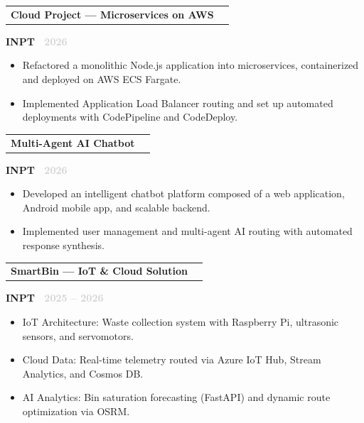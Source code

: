 \documentclass[10.5pt,a4paper]{article}
\makeatletter
\newcommand{\entryheader}[2]{%
  \noindent
  \begin{tabularx}{\linewidth}{@{}X r@{}}
    \textbf{\normalsize #1} & {\small\textcolor{lightgray}{#2}}
  \end{tabularx}\vspace{-1pt}
}
\newcommand{\cvsubline}[1]{%
  {\normalsize\textbf{\textcolor{accent}{#1}}}\par\vspace{2pt}
}
\makeatother
\begin{document}
\begin{minipage}[t]{0.64\linewidth}
\vspace{4pt}

\entryheader{Cloud Project --- Microservices on AWS}{}
\cvsubline{INPT \hfill {\small\normalfont\textcolor{lightgray}{\faCalendar*\ 2026}}}
\begin{itemize}
  \item Refactored a monolithic Node.js application into microservices, containerized and deployed on AWS ECS Fargate.
  \item Implemented Application Load Balancer routing and set up automated deployments with CodePipeline and CodeDeploy.
\end{itemize}


\vspace{4pt}

\entryheader{Multi-Agent AI Chatbot}{}
\cvsubline{INPT \hfill {\small\normalfont\textcolor{lightgray}{\faCalendar*\ 2026}}}
\begin{itemize}
  \item Developed an intelligent chatbot platform composed of a web application, Android mobile app, and scalable backend.
  \item Implemented user management and multi-agent AI routing with automated response synthesis.
\end{itemize}


\vspace{4pt}

\entryheader{SmartBin --- IoT \& Cloud Solution}{}
\cvsubline{INPT \hfill {\small\normalfont\textcolor{lightgray}{\faCalendar*\ 2025 -- 2026}}}
\begin{itemize}
  \item IoT Architecture: Waste collection system with Raspberry Pi, ultrasonic sensors, and servomotors.
  \item Cloud Data: Real-time telemetry routed via Azure IoT Hub, Stream Analytics, and Cosmos DB.
  \item AI Analytics: Bin saturation forecasting (FastAPI) and dynamic route optimization via OSRM.
\end{itemize}



\end{minipage}%
\hfill%
\end{document}
